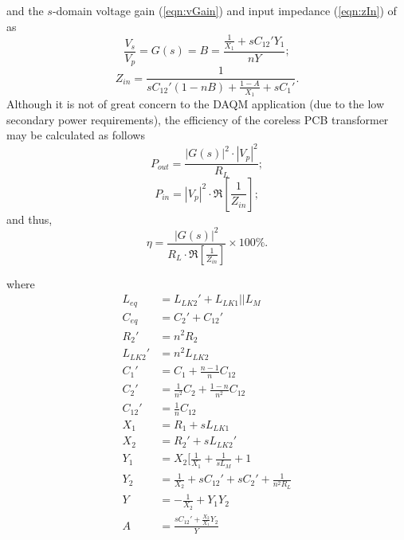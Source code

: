 \documentclass[conference]{IEEEtran}
\begin{document}
\hspace{-20pt} and the $s$-domain voltage gain (\ref{eqn:vGain}) and input impedance (\ref{eqn:zIn}) of as
%
\begin{equation}
	\label{eqn:vGain}
	\frac{V_{s}}{V_{p}} = G(s) = B = \frac{\frac{1}{X_{1}}+sC_{12}'Y_{1}}{nY};
\end{equation}
%
\begin{equation}
	\label{eqn:zIn}
	Z_{in} = \frac{1}{sC_{12}'(1-nB)+\frac{1-A}{X_{1}}+sC_{1}'}.
\end{equation}
%
\hspace{-20pt} Although it is not of great concern to the DAQM application (due to the low secondary power requirements), the efficiency of the coreless PCB transformer may be calculated as follows
\begin{equation}
	P_{out} = \frac{|G(s)|^{2}\cdot|V_{p}|^{2}}{R_{L}};
\end{equation}
\begin{equation}
	P_{in} = |V_{p}|^{2}\cdot\Re \left[ \frac{1}{Z_{in}} \right];
\end{equation}
\hspace{-20pt} and thus, \\
\begin{equation}
	\eta = \frac{|G(s)|^{2}}{R_{L}\cdot\Re \left[ \frac{1}{Z_{in}} \right]}\times 100 \%.
\end{equation}

\hspace{-20pt} where \\

\begin{align*}
	L_{eq}   &= L_{LK2}'+L_{LK1}||L_{M} 	\\
	C_{eq}   &= C_{2}'+C_{12}'				\\
	R_{2}'   &= n^{2}R_{2}					\\
	L_{LK2}' &= n^{2}L_{LK2}				\\
	C_{1}'   &= C_{1} + \frac{n-1}{n}C_{12}	\\
	C_{2}'   &= \frac{1}{n^{2}}C_{2} + \frac{1-n}{n^{2}}C_{12}	\\
	C_{12}'  &= \frac{1}{n}C_{12}			\\
	X_{1}    &= R_{1}  + sL_{LK1}			\\
	X_{2}    &= R_{2}' + sL_{LK2}'			\\
	Y_{1}    &= X_{2} \lbrack \frac{1}{X_{1}} + \frac{1}{sL_{M}}+1	\\
	Y_{2}    &= \frac{1}{X_{2}} + sC_{12}' + sC_{2}' + \frac{1}{n^{2}R_{L}}	\\
	Y        &= -\frac{1}{X_{2}} + Y_{1}Y_{2}	\\
	A        &= \frac{sC_{12}' + \frac{X_{2}}{X_{1}} Y_{2}}{Y}
\end{align*}
\end{document}
